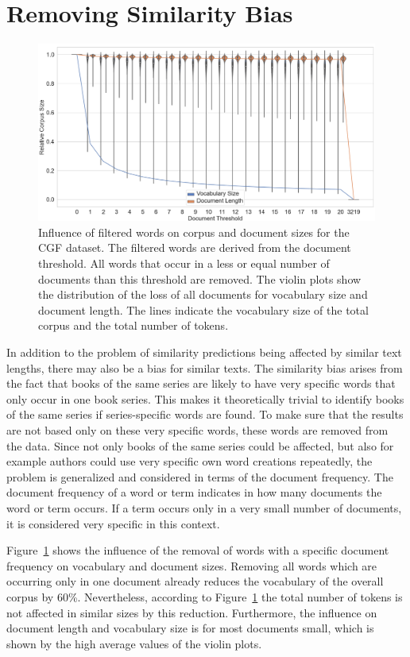 \documentclass[11pt]{article}
\begin{document}
\section{Removing Similarity Bias}
\begin{figure}
	\centering
	\includegraphics[width=\linewidth]{figures/specific_words_graph}
	\caption{Influence of filtered words on corpus and document sizes for the CGF dataset.
		The filtered words are derived from the document threshold. 
		All words that occur in a less or equal number of documents than this threshold are removed.
		The violin plots show the distribution of the loss of all documents for vocabulary size and document length.
		The lines indicate the vocabulary size of the total corpus and the total number of tokens.}
	\label{fig:specific_words}
\end{figure}
In addition to the problem of similarity predictions being affected by similar text lengths, there may also be a bias for similar texts.
The similarity bias arises from the fact that books of the same series are likely to have very specific words that only occur in one book series.
This makes it theoretically trivial to identify books of the same series if series-specific words are found.
To make sure that the results are not based only on these very specific words, these words are removed from the data.
Since not only books of the same series could be affected, but also for example authors could use very specific own word creations repeatedly, the problem is generalized and considered in terms of the document frequency.
The document frequency of a word or term indicates in how many documents the word or term occurs.
If a term occurs only in a very small number of documents, it is considered very specific in this context.

Figure~\ref{fig:specific_words} shows the influence of the removal of words with a specific document frequency on vocabulary and document sizes.
Removing all words which are occurring only in one document already reduces the vocabulary of the overall corpus by 60\%.
Nevertheless, according to Figure~\ref{fig:specific_words} the total number of tokens is not affected in similar sizes by this reduction.
Furthermore, the influence on document length and vocabulary size is for most documents small, which is shown by the high average values of the violin plots.
\end{document}
